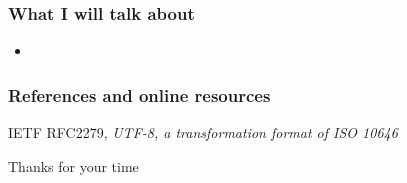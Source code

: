 \documentclass[unicode, hyperref={pdfpagemode=None}]{beamer}
\begin{document}

\begin{frame}
    \frametitle{What I will talk about}
    \begin{itemize}
        \item
            \pause
    \end{itemize}
\end{frame}

\begin{frame}
    \frametitle{References and online resources}
    \begin{thebibliography}{9}
         IETF RFC2279, \textit{UTF-8, a transformation format of
            ISO 10646}
    \end{thebibliography}
\end{frame}

\begin{frame}
    \begin{center}
        {\huge 
        Thanks for your time }
    \end{center}
\end{frame}

\newpage
\end{document}
